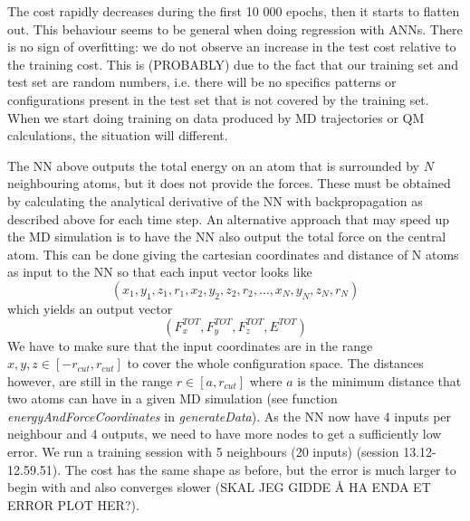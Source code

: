 \documentclass[twoside,english]{uiofysmaster}
\begin{document}
The cost rapidly decreases during the first 10 000 epochs, then it starts to flatten out. This behaviour seems
to be general when doing regression with ANNs. 
There is no sign of overfitting: we do not observe an increase in the test cost relative to the training cost. 
This is (PROBABLY) due to the fact that our training set and test set are random numbers, i.e. there will be no 
specifics patterns or configurations present in the test set that is not covered by the training set. 
When we start doing training on data produced by MD trajectories or QM calculations, the situation will different.

The NN above outputs the total energy on an atom that is surrounded by $N$ neighbouring atoms, but it does not provide the forces. 
These must be obtained by calculating the analytical derivative of the NN with backpropagation as described above for each time step.
An alternative approach that may speed up the MD simulation is to have the NN also output the total force on the central atom. 
This can be done giving the cartesian coordinates and distance of N atoms as input to the NN so that each input
vector looks like
\begin{equation}
 (x_1, y_1, z_1, r_1, x_2, y_2, z_2, r_2, \dots, x_N, y_N, z_N, r_N)
\end{equation}
which yields an output vector
\begin{equation}
 (F_x^{TOT}, F_y^{TOT}, F_z^{TOT}, E^{TOT})
\end{equation}
We have to make sure that the input coordinates are in the range 
$x, y, z \in [-r_{cut}, r_{cut}]$ to cover the whole configuration space. The distances however, are still in the range
$r \in [a, r_{cut}]$ where $a$ is the minimum distance that two atoms can have in a given MD simulation (see function
\textit{energyAndForceCoordinates} in \textit{generateData}). As the NN now have 4 inputs per neighbour and 4 outputs, 
we need to have more nodes to get a sufficiently low error. We run a training session with 5 neighbours (20 inputs) 
(session 13.12-12.59.51). The cost has the same shape as before, but the error is much larger to begin with and also converges
slower (SKAL JEG GIDDE Å HA ENDA ET ERROR PLOT HER?).
\end{document}
